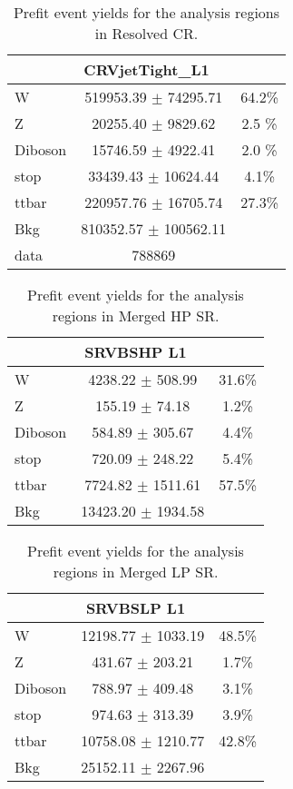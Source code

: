 \begin{table}
\caption{Prefit event yields for the analysis regions in Resolved \Wjets CR.}
\label{tab:PrefitYield_WCRRes_Per}
\begin{center}
\begin{tabular}{|l|c|c|}
\hline
\multicolumn{3}{|c|}{CRVjetTight\_L1}\\ \hline
W & 519953.39 $\pm$ 74295.71 & 64.2\%\\
Z & 20255.40 $\pm$ 9829.62 & 2.5 \% \\
Diboson & 15746.59 $\pm$ 4922.41 & 2.0 \% \\
stop & 33439.43 $\pm$ 10624.44 & 4.1\% \\
ttbar & 220957.76 $\pm$ 16705.74 & 27.3\% \\
\hline
Bkg & 810352.57 $\pm$ 100562.11 & \\
\hline
data & 788869 & \\ \hline
\end{tabular}
\end{center}
\end{table}

\begin{table}
\caption{Prefit event yields for the analysis regions in \olep Merged HP SR.}
\label{tab:PrefitYield_1lepHPSR_Per}
\begin{center}
\begin{tabular}{|l|c|c|}
\hline
  \multicolumn{3}{|c|}{SRVBSHP L1}\\ \hline
W & 4238.22 $\pm$ 508.99 & 31.6\% \\
Z & 155.19 $\pm$ 74.18 & 1.2\%\\
Diboson & 584.89 $\pm$ 305.67& 4.4\%\\
stop & 720.09 $\pm$ 248.22 & 5.4\%\\
ttbar & 7724.82 $\pm$ 1511.61 & 57.5\%\\
\hline
Bkg & 13423.20 $\pm$ 1934.58 & \\
\hline
\end{tabular}
\end{center}
\end{table}


\begin{table}
\begin{center}
\caption{Prefit event yields for the analysis regions in \olep Merged LP SR.}
\label{tab:PrefitYield_1lepLPSR_Per}
\begin{tabular}{|l|c| c|}
\hline
\multicolumn{3}{|c|}{SRVBSLP L1}\\ \hline
W & 12198.77 $\pm$ 1033.19 & 48.5\% \\
Z & 431.67 $\pm$ 203.21 & 1.7\% \\
Diboson & 788.97 $\pm$ 409.48 & 3.1\% \\
stop & 974.63 $\pm$ 313.39 & 3.9\% \\
ttbar & 10758.08 $\pm$ 1210.77 & 42.8\% \\
\hline
Bkg & 25152.11 $\pm$ 2267.96 & \\ \hline
\end{tabular}
\end{center}
\end{table}

